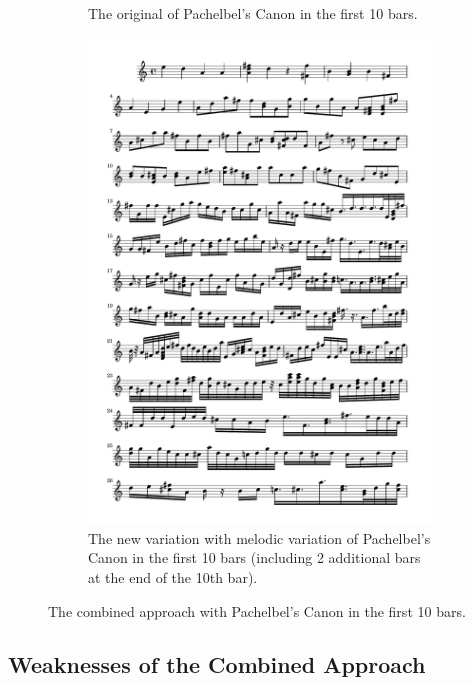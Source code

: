 \documentclass[11pt]{article}
\theoremstyle{definition}
\begin{document}
\begin{figure}
\begin{subfigure}{\textwidth}
\caption{The original of Pachelbel's Canon in the first 10 bars.} 
\label{fig:OCND}
\end{subfigure}
\begin{subfigure}{\textwidth}
\centering
\includegraphics[trim=1cm 20.3cm 1cm 0.5cm, clip, scale=0.8]{New_CND.pdf}
\caption{The new variation with melodic variation of Pachelbel's Canon in the first 10 bars (including 2 additional bars at the end of the 10th bar).} 
\label{fig:NCND}
\end{subfigure}
\caption{The combined approach with Pachelbel's Canon in the first 10 bars.} 
\label{fig: exam1}
\end{figure}

\subsection{Weaknesses of the Combined Approach}
\end{document}
